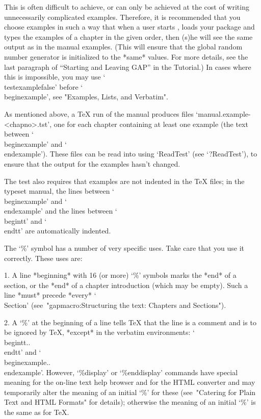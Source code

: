 This is often difficult to achieve, or can only be achieved at the cost of
writing unnecessarily complicated examples. Therefore, it is recommended that
you choose examples in such a way that when a user starts {\GAP}, loads your 
package and types the examples of a chapter in the given order, then (s)he will
see the same output as in the manual examples. (This will ensure that the 
global random number generator is initialized to the *same* values.
For more details,
see the last paragraph of ``Starting and Leaving GAP''
in the {\GAP} Tutorial.)
In cases where this is 
impossible, you may use `\\testexamplefalse' before `\\beginexample', see 
"Examples, Lists, and Verbatim".

As mentioned above, a {\TeX} run of the manual produces files
`manual.example-<chapno>.tst', one for each chapter containing at least
one {\GAP} example (the text between `\\beginexample'
and `\\endexample'). These files can be read into {\GAP} using `ReadTest' 
(see `?ReadTest'), to ensure that the {\GAP} output for the examples
hasn't changed.

The test also requires that examples are not indented
in the {\TeX} files; in the typeset manual,
the lines between `\\beginexample' and `\\endexample'
and the lines between `\\begintt' and `\\endtt' are automatically
indented.



\indextt{\%}
The `\%' symbol has a number of very specific uses. Take  care  that  you
use it correctly. These uses are:
\beginlist%
\item{1.}
A line *beginning* with 16 (or more) `\%' symbols marks the  *end*  of  a
section, or the *end* of a chapter introduction  (which  may  be  empty).
Such  a  line  *must* precede  *every*  `\\Section' 
(see~"gapmacro:Structuring the text: Chapters and Sections").

\item{2.}
A `\%' at the beginning of a line tells {\TeX} that the line is a comment
and is to be ignored by {\TeX}, *except* in  the  verbatim  environments:
`\\begintt..\\endtt'   and    `\\beginexample..\\endexample'.    However,
`\%display' or `\%enddisplay'  commands  have  special  meaning  for  the
on-line text help browser and for the HTML converter and may  temporarily
alter the meaning of an initial `\%' for these (see~"Catering  for  Plain
Text and HTML Formats" for details); otherwise the meaning of an  initial
`\%' is the same as for {\TeX}.

